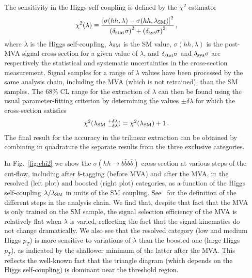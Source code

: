 \documentclass[a4paper,10pt]{article}
\newcommand{\be}{\begin{equation}}
\newcommand{\ee}{\end{equation}}
\newcommand{\lc}{\left[}
\newcommand{\rc}{\right]}
\newcommand{\lp}{\left(}
\newcommand{\rp}{\right)}
\begin{document}
  The sensitivity in the Higgs self-coupling is defined by the $\chi^2$ estimator
  \be
  \label{eq:chi2profile}
  \chi^2(\lambda) \equiv \frac{\lc \sigma(hh,\lambda) - \sigma(hh,\lambda_{\rm SM})
    \rc^2}{\lp \delta_{\rm stat}\sigma\rp^2+\lp \delta_{\rm sys}\sigma\rp^2 } \, ,
  \ee
  where $\lambda$ is the Higgs
  self-coupling, $\lambda_{\rm SM}$ is the SM value, $\sigma(hh,\lambda)$ is the
  post-MVA signal cross-section for a given value of $\lambda$, and $\delta_{\rm stat}\sigma$ and
  $\delta_{\rm sys}\sigma$ are respectively the statistical and systematic uncertainties in the cross-section
  measurement.
  Signal samples for a range of $\lambda$ values have been  processed
  by the same analysis chain, including the MVA (which is not
  retrained), than the SM samples.
  The 68\% CL range for the extraction of $\lambda$ can then be found using
  the usual parameter-fitting criterion by determining the values $\pm \delta\lambda$
  for which the cross-section satisfies
  \be
  \label{eq:condition}
\chi^2(\lambda_{\rm SM}~^{+\delta\lambda}_{-\delta\lambda})=\chi^2(\lambda_{\rm SM})+1 \, .
\ee
%
The final result for the accuracy in the trilinear extraction can be obtained by combining
in quadrature the separate results
from the three exclusive categories.

In Fig.~\ref{fig:chi2} we show the $\sigma(hh\to b\bar{b}b\bar{b})$ cross-section at
  various steps of the cut-flow, including after $b$-tagging
  (before MVA) and after the MVA, in the resolved (left plot)
  and boosted (right plot) categories,  as a function of the Higgs self-coupling
  $\lambda/\lambda_{\rm SM}$ in units of the SM coupling.
  See~\cite{Behr:2015oqq} for the definition of the different steps
  in the analysis chain.
  We find that, despite that fact that the MVA is only trained on the SM sample, the signal
  selection efficiency of the MVA is relatively flat when $\lambda$ is varied, reflecting the fact
  that the signal kinematics do not change dramatically.
  We also see that the resolved category (low and medium Higgs $p_T$) is more sensitive to variations of $\lambda$ than
  the boosted one (large Higgs $p_T$), as indicated by the shallower minimum of the latter after the MVA.
  This reflects the well-known fact that the triangle diagram (which depends on the Higgs self-coupling) is
  dominant near the threshold region.
 
\end{document}
